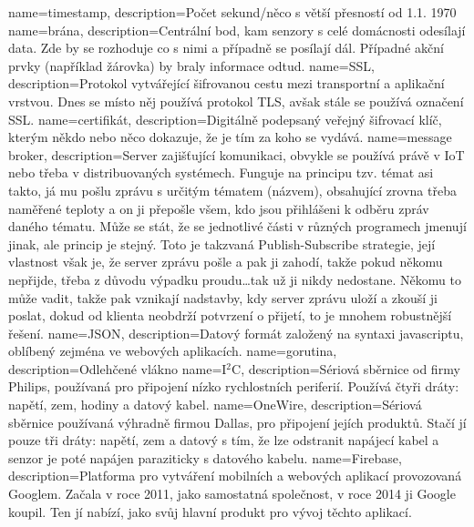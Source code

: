 {
  name={timestamp},
  description={Počet sekund/něco s větší přesností od 1.1. 1970}
}
{
  name={brána},
  description={Centrální bod, kam senzory s celé domácnosti odesílají data. Zde by se rozhoduje co s nimi a případně se 
  posílají dál. Případné akční prvky (například žárovka) by braly informace odtud.}
}
{
  name={SSL},
  description={Protokol vytvářející šifrovanou cestu mezi transportní a aplikační vrstvou. Dnes se místo něj používá 
protokol TLS, avšak stále se používá označení SSL.}
}
{
  name={certifikát},
  description={Digitálně podepsaný veřejný šifrovací klíč, kterým někdo nebo něco dokazuje, že je tím za koho se 
vydává.}
}
{
  name={message broker},
  description={Server zajišťující komunikaci, obvykle se používá právě v IoT nebo třeba v distribuovaných systémech. 
Funguje na principu tzv. témat asi takto, já mu pošlu zprávu s určitým tématem (názvem), obsahující zrovna třeba 
naměřené teploty a on ji přepošle všem, kdo jsou přihlášeni k odběru zpráv daného tématu. Může se stát, že se jednotlivé 
části v různých programech jmenují jinak, ale princip je stejný. Toto je takzvaná Publish-Subscribe strategie, její 
vlastnost však je, že server zprávu pošle a pak ji zahodí, takže pokud někomu nepřijde, třeba z důvodu výpadku 
proudu\ldots tak už ji nikdy nedostane. Někomu to může vadit, takže pak vznikají nadstavby, kdy server zprávu uloží 
a zkouší ji poslat, dokud od klienta neobdrží potvrzení o přijetí, to je mnohem robustnější řešení.}
}
{
  name={JSON},
  description={Datový formát založený na syntaxi javascriptu, oblíbený zejména ve webových aplikacích.}
}
{
  name={gorutina},
  description={Odlehčené vlákno}
}
{
  name={I$^2$C},
  description={Sériová sběrnice od firmy Philips, používaná pro připojení nízko rychlostních periferií. Používá čtyři 
dráty: napětí, zem, hodiny a datový kabel.}
}
{
  name={OneWire},
  description={Sériová sběrnice používaná výhradně firmou Dallas, pro připojení jejích produktů. Stačí jí pouze tři 
dráty: napětí, zem a datový s tím, že lze odstranit napájecí kabel a senzor je poté napájen paraziticky s datového 
kabelu.}
}
{
  name={Firebase},
  description={Platforma pro vytváření mobilních a webových aplikací provozovaná Googlem. Začala v roce 2011, jako 
samostatná společnost, v roce 2014 ji Google koupil. Ten jí nabízí, jako svůj hlavní produkt pro vývoj těchto aplikací.}
}

